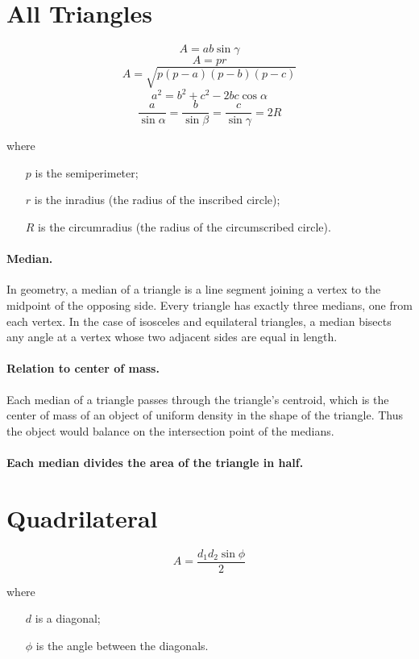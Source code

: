\documentclass[oneside]{book} %
\theoremstyle{plain}
\begin{document}
\section{All Triangles}
\[A = a b \sin \gamma \]
\[A = p r\]
\[A = \sqrt{p \left ( p - a \right ) \left ( p - b \right ) \left ( p - c
\right )}\]
\[a^2 = b^2 + c^2 - 2 b c \cos \alpha\]
\[\frac{a}{\sin \alpha} = \frac{b}{\sin \beta} = \frac{c}{\sin \gamma} = 2R\]

where

\begin{itemize}
  \item[\(p\)] is the semiperimeter;
  \item[\(r\)] is the inradius (the radius of the inscribed circle);
  \item[\(R\)] is the circumradius (the radius of the circumscribed circle).
\end{itemize}

\paragraph{Median.} In geometry, a median of a triangle is a line segment
joining a vertex to the midpoint of the opposing side. Every triangle has
exactly three medians, one from each vertex. In the case of isosceles and
equilateral triangles, a median bisects any angle at a vertex whose two adjacent
sides are equal in length.

\paragraph{Relation to center of mass.} Each median of a triangle passes through
the triangle's centroid, which is the center of mass of an object of uniform
density in the shape of the triangle. Thus the object would balance on the
intersection point of the medians.

\paragraph{Each median divides the area of the triangle in half.}

\section{Quadrilateral}
\[A = \frac{d_1 d_2 \sin{\phi}}{2}\]

where

\begin{itemize}
  \item[\(d\)] is a diagonal;
  \item[\(\phi\)] is the angle between the diagonals.
\end{itemize}
\end{document}
